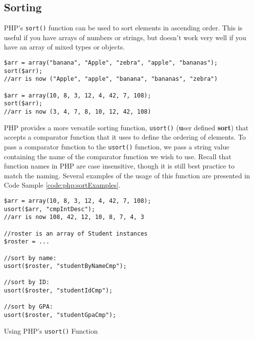 \subsection{Sorting}

PHP's \texttt{sort()} function can be used to sort elements
in ascending order.  This is useful if you have arrays of numbers or
strings, but doesn't work very well if you have an array of mixed types
or objects.  

\begin{verbatim}
$arr = array("banana", "Apple", "zebra", "apple", "bananas");
sort($arr);
//arr is now ("Apple", "apple", "banana", "bananas", "zebra")

$arr = array(10, 8, 3, 12, 4, 42, 7, 108);
sort($arr);
//arr is now (3, 4, 7, 8, 10, 12, 42, 108)
\end{verbatim}

PHP provides a more versatile sorting function, \texttt{usort()}
(\textbf{u}ser defined \textbf{sort}) that accepts a comparator function that
it uses to define the ordering of elements.  To pass a comparator function
to the \texttt{usort()} function, we pass a string value containing
the name of the comparator function we wish to use.  Recall that function
names in PHP are case insensitive, though it is still best practice to
match the naming. Several examples of the usage 
of this function are presented in Code Sample \ref{code:php:sortExamples}.

\begin{listing}[!h]
\begin{verbatim}
$arr = array(10, 8, 3, 12, 4, 42, 7, 108);
usort($arr, "cmpIntDesc");
//arr is now 108, 42, 12, 10, 8, 7, 4, 3

//roster is an array of Student instances
$roster = ...

//sort by name:
usort($roster, "studentByNameCmp");

//sort by ID:
usort($roster, "studentIdCmp");

//sort by GPA:
usort($roster, "studentGpaCmp");
\end{verbatim}
\caption{Using PHP's \texttt{usort()} Function}
\label{code:php:sortExamples}
\end{listing}


